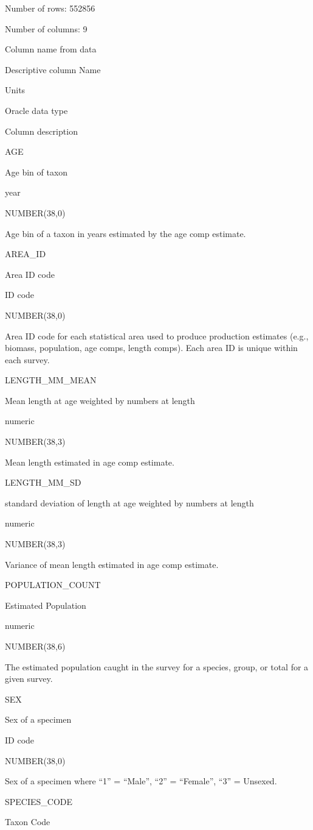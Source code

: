 \documentclass[
  letterpaper,
  oneside,
  open=any]{scrbook}
\begin{document}
Number of rows: 552856

Number of columns: 9

Column name from data

Descriptive column Name

Units

Oracle data type

Column description

AGE

Age bin of taxon

year

NUMBER(38,0)

Age bin of a taxon in years estimated by the age comp estimate.

AREA\_ID

Area ID code

ID code

NUMBER(38,0)

Area ID code for each statistical area used to produce production
estimates (e.g., biomass, population, age comps, length comps). Each
area ID is unique within each survey.

LENGTH\_MM\_MEAN

Mean length at age weighted by numbers at length

numeric

NUMBER(38,3)

Mean length estimated in age comp estimate.

LENGTH\_MM\_SD

standard deviation of length at age weighted by numbers at length

numeric

NUMBER(38,3)

Variance of mean length estimated in age comp estimate.

POPULATION\_COUNT

Estimated Population

numeric

NUMBER(38,6)

The estimated population caught in the survey for a species, group, or
total for a given survey.

SEX

Sex of a specimen

ID code

NUMBER(38,0)

Sex of a specimen where ``1'' = ``Male'', ``2'' = ``Female'', ``3'' =
Unsexed.

SPECIES\_CODE

Taxon Code
\end{document}
